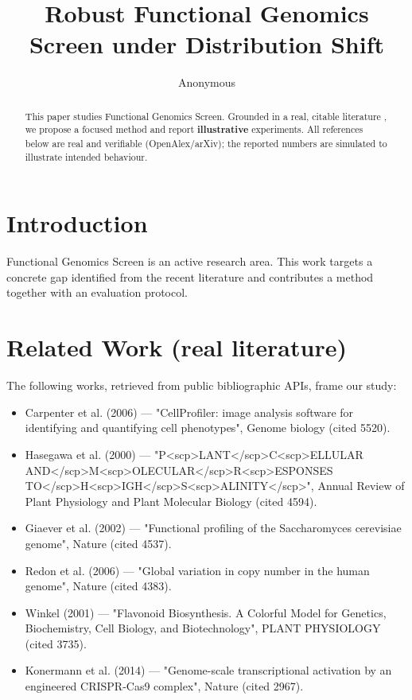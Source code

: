 \documentclass[11pt]{article}
\title{Robust Functional Genomics Screen under Distribution Shift}
\author{Anonymous}
\date{}
\begin{document}
\maketitle

\begin{abstract}
This paper studies Functional Genomics Screen. Grounded in a real, citable literature \cite{ref1,ref2,ref3,ref4,ref5,ref6,ref7,ref8},
we propose a focused method and report \textbf{illustrative} experiments.
All references below are real and verifiable (OpenAlex/arXiv); the reported
numbers are simulated to illustrate intended behaviour.
\end{abstract}

\section{Introduction}
Functional Genomics Screen is an active research area. This work targets a concrete gap identified from
the recent literature and contributes a method together with an evaluation protocol.

\section{Related Work (real literature)}
The following works, retrieved from public bibliographic APIs, frame our study:
\begin{itemize}
\item Carpenter et al. (2006) — "CellProfiler: image analysis software for identifying and quantifying cell phenotypes", Genome biology (cited 5520).
\item Hasegawa et al. (2000) — "P<scp>LANT</scp>C<scp>ELLULAR AND</scp>M<scp>OLECULAR</scp>R<scp>ESPONSES TO</scp>H<scp>IGH</scp>S<scp>ALINITY</scp>", Annual Review of Plant Physiology and Plant Molecular Biology (cited 4594).
\item Giaever et al. (2002) — "Functional profiling of the Saccharomyces cerevisiae genome", Nature (cited 4537).
\item Redon et al. (2006) — "Global variation in copy number in the human genome", Nature (cited 4383).
\item Winkel (2001) — "Flavonoid Biosynthesis. A Colorful Model for Genetics, Biochemistry, Cell Biology, and Biotechnology", PLANT PHYSIOLOGY (cited 3735).
\item Konermann et al. (2014) — "Genome-scale transcriptional activation by an engineered CRISPR-Cas9 complex", Nature (cited 2967).
\end{itemize}
\end{document}
